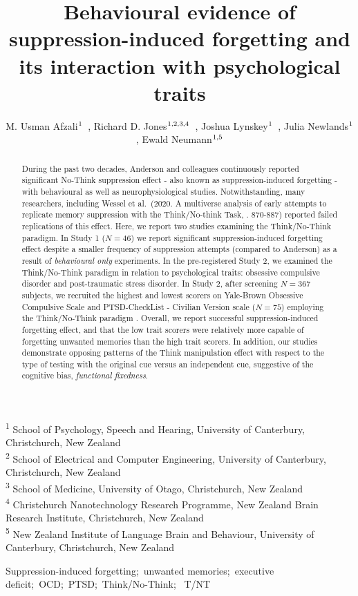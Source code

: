 \documentclass[
]{interact}
\title{Behavioural evidence of suppression-induced forgetting and its
interaction with psychological traits}
\author{M. Usman
Afzali$\textsuperscript{1}$~\orcidlink{0000-0001-5119-9388}, Richard D.
Jones$\textsuperscript{1,2,3,4}$~\orcidlink{0000-0003-2287-3358}, Joshua
Lynskey$\textsuperscript{1}$~\orcidlink{0000-0000-0000-0000}, Julia
Newlands$\textsuperscript{1}$~\orcidlink{0000-0000-0000-0000}, Ewald
Neumann$\textsuperscript{1,5}$~\orcidlink{0000-0001-6494-0294}}
\begin{document}
\maketitle
\textsuperscript{1} School of Psychology, Speech and Hearing, University
of Canterbury, Christchurch, New Zealand\\ \textsuperscript{2} School of
Electrical and Computer Engineering, University of
Canterbury, Christchurch, New Zealand\\ \textsuperscript{3} School of
Medicine, University of Otago, Christchurch, New
Zealand\\ \textsuperscript{4} Christchurch Nanotechnology Research
Programme, New Zealand Brain Research Institute, Christchurch, New
Zealand\\ \textsuperscript{5} New Zealand Institute of Language Brain
and Behaviour, University of Canterbury, Christchurch, New Zealand
\begin{abstract}
During the past two decades, Anderson and colleagues continuously
reported significant No-Think suppression effect - also known as
suppression-induced forgetting - with behavioural as well as
neurophysiological studies. Notwithstanding, many researchers, including
Wessel et al.~(2020. A multiverse analysis of early attempts to
replicate memory suppression with the Think/No-think Task, . 870-887)
reported failed replications of this effect. Here, we report two studies
examining the Think/No-Think paradigm. In Study 1 (\(N = 46\)) we report
significant suppression-induced forgetting effect despite a smaller
frequency of suppression attempts (compared to Anderson) as a result of
\textit{behavioural only} experiments. In the pre-registered Study 2, we
examined the Think/No-Think paradigm in relation to psychological
traits: obsessive compulsive disorder and post-traumatic stress
disorder. In Study 2, after screening \(N = 367\) subjects, we recruited
the highest and lowest scorers on Yale-Brown Obsessive Compulsive Scale
and PTSD-CheckList - Civilian Version scale (\(N = 75\)) employing the
Think/No-Think paradigm . Overall, we report successful
suppression-induced forgetting effect, and that the low trait scorers
were relatively more capable of forgetting unwanted memories than the
high trait scorers. In addition, our studies demonstrate opposing
patterns of the Think manipulation effect with respect to the type of
testing with the original cue versus an independent cue, suggestive of
the cognitive bias, \textit{functional fixedness}.
\end{abstract}
\begin{keywords}
\def\sep{;\ }
Suppression-induced forgetting\sep unwanted memories\sep executive
deficit\sep OCD\sep PTSD\sep Think/No-Think\sep 
T/NT
\end{keywords}
\ifdefined\Shaded\renewenvironment{Shaded}{\begin{tcolorbox}[borderline west={3pt}{0pt}{shadecolor}, enhanced, interior hidden, frame hidden, boxrule=0pt, sharp corners, breakable]}{\end{tcolorbox}}\fi
\end{document}
